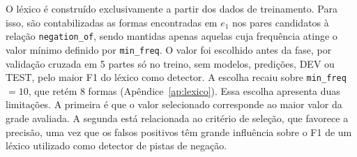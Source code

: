 O léxico é construído exclusivamente a partir dos dados de treinamento. Para isso, são contabilizadas as formas encontradas em $e_1$ nos pares candidatos à relação \texttt{negation\_of}, sendo mantidas apenas aquelas cuja frequência atinge o valor mínimo definido por \texttt{min\_freq}. O valor foi escolhido antes da fase, por validação cruzada em 5 partes só no treino, sem modelos, predições, DEV ou TEST, pelo maior F1 do léxico como detector. A escolha recaiu sobre
\texttt{min\_freq}$=10$, que retém 8 formas (Apêndice~\ref{ap:lexico}). Essa escolha apresenta duas limitações. A primeira é que o valor selecionado corresponde ao maior valor da grade avaliada. A segunda está relacionada ao critério de seleção, que favorece a precisão, uma vez que os falsos positivos têm grande influência sobre o F1 de um léxico utilizado como detector de pistas de negação.
